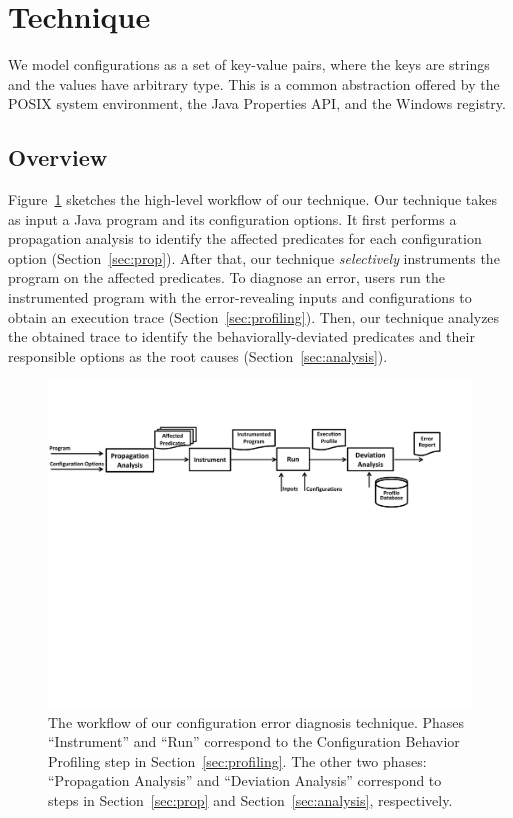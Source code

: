 \section{Technique}
\label{sec:technique}

We model configurations as a set of key-value pairs, where
the keys are strings and the values have arbitrary type. This is
a common abstraction offered
by the POSIX system environment, the Java Properties API,
and the Windows registry.


\subsection{Overview}

Figure~\ref{fig:workflow} sketches the high-level workflow of our technique.
Our technique takes as input a Java program and its configuration options.
It first performs a propagation analysis to identify
the affected predicates for each configuration option (Section~\ref{sec:prop}).
After that, our technique \textit{selectively} instruments
the program on the affected predicates. 
To diagnose an error, users run the instrumented program
with the error-revealing inputs and configurations
 to obtain an execution trace (Section~\ref{sec:profiling}).
Then, our technique analyzes the obtained trace
to identify the behaviorally-deviated predicates and their
responsible options as the root causes (Section~\ref{sec:analysis}).




\begin{figure}[!]
  \centering
  \includegraphics[scale=0.600]{architecture}
  \vspace*{-2.0ex}\caption {{\label{fig:workflow} The workflow of our configuration error diagnosis technique.
Phases ``Instrument'' and ``Run'' correspond to the Configuration Behavior Profiling step in Section~\ref{sec:profiling}.
The other two phases: ``Propagation Analysis'' and ``Deviation Analysis'' correspond to steps in Section~\ref{sec:prop} and Section~\ref{sec:analysis}, respectively.
}}
\end{figure}

